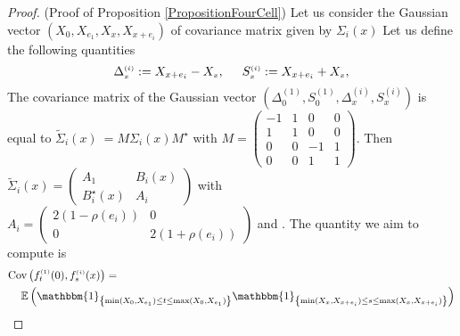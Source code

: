 \documentclass[12pt]{article}
\renewcommand{\tilde}{\widetilde}
\theoremstyle{Theorem}
\theoremstyle{definition}
\begin{document}
\begin{proof}(Proof of Proposition \ref{PropositionFourCell})
Let us consider the Gaussian vector $\left(X_{\scriptscriptstyle 0}, X_{e_1}, X_{\scriptscriptstyle x}, X_{x+e_i}\right)$ of covariance matrix given by $\Sigma_{i}(x)$ 
Let us define the following quantities   \begin{equation} \label{expressions} \Delta^{\scriptscriptstyle (i)}_{\scriptscriptstyle x} := X_{x+e_i} - X_{\scriptscriptstyle x}, \hspace{0.5cm} S^{\scriptscriptstyle (i)}_{\scriptscriptstyle x} := X_{x+e_i} + X_{\scriptscriptstyle x},\end{equation}
The covariance matrix of the Gaussian vector $\left(\Delta^{\scriptscriptstyle (1)}_{\scriptscriptstyle 0}, S^{\scriptscriptstyle (1)}_{\scriptscriptstyle 0}, \Delta^{\scriptscriptstyle (i)}_{\scriptscriptstyle x}, S^{\scriptscriptstyle (i)}_{\scriptscriptstyle x}\right)$ is equal to ${\tilde{\Sigma}_{i}(x)~= M\Sigma_{i}(x) M^{\star}}$ with {\small $M = \begin{pmatrix}
-1 & 1 & 0 &  0 \\
1 & 1 & 0 &  0 \\
0& 0 & -1 &  1 \\
0 & 0 & 1 & 1
\end{pmatrix}$}. Then $\tilde{\Sigma}_{i}(x) = \begin{pmatrix} A_{1} & B_{i}(x) \\ B^{\star}_{i}(x) & A_{i} \end{pmatrix}$
with 
$A_{i} = \begin{pmatrix} 2(1-\rho(e_i)) & 0 \\ 0 & 2(1+\rho(e_i))\end{pmatrix}$ and . The quantity we aim to compute is 
{\small
\begin{align}
\label{covconf}
\text{Cov}\left(f_{t}^{\scriptscriptstyle (1)}(0), f_{s}^{ \scriptscriptstyle (i)}(x)\right) & = \nonumber \\
& \hspace{-2.7cm} \mathbb{E}\left(\mathbbm{1}_{\left\{\min(X_{\scriptscriptstyle 0}, X_{e_1}) \leq t \leq \max(X_{\scriptscriptstyle 0}, X_{e_1})\right\}}\mathbbm{1}_{\left\{\min(X_{\scriptscriptstyle x}, X_{x+e_i}) \leq s \leq \max(X_{\scriptscriptstyle x}, X_{x+e_i}) \right\}}\right) \nonumber\\

\end{align}}
\end{proof}
\end{document}
